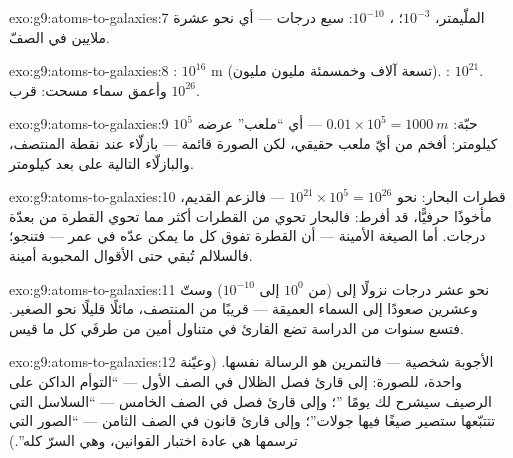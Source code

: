 \begin{solution}{exo:g9:atoms-to-galaxies:7}
الملّيمتر، $10^{-3}$؛ ، $10^{-10}$: سبع درجات --- أي
نحو عشرة ملايين  في الصفّ.
\end{solution}

\begin{solution}{exo:g9:atoms-to-galaxies:8}
: $10^{16}$ \unit{m} (تسعة آلاف وخمسمئة مليون
مليون). : $10^{21}$. وأعمق سماء مسحت: قرب
$10^{26}$.
\end{solution}

\begin{solution}{exo:g9:atoms-to-galaxies:9}
$10^{5}$ حبّة: $0.01 \times 10^{5} = \qty{1000}{m}$ --- أي
``ملعب'' عرضه كيلومتر: أفخم من أيّ ملعب حقيقي، لكن الصورة
قائمة --- بازلّاء عند نقطة المنتصف، والبازلّاء التالية على
بعد كيلومتر.
\end{solution}

\begin{solution}{exo:g9:atoms-to-galaxies:10}
قطرات البحار: نحو $10^{21} \times 10^{5} = 10^{26}$ --- فالزعم
القديم، مأخوذًا حرفيًّا، قد أفرط: فالبحار تحوي من القطرات أكثر
مما تحوي القطرة من  بعدّة درجات. أما الصيغة الأمينة
--- أن  القطرة تفوق كل ما يمكن عدّه في عمر --- فتنجو؛
فالسلالم تُبقي حتى الأقوال المحبوبة أمينة.
\end{solution}

\begin{solution}{exo:g9:atoms-to-galaxies:11}
نحو عشر درجات نزولًا إلى  (من $10^{0}$ إلى $10^{-10}$)
وستّ وعشرين صعودًا إلى السماء العميقة --- قريبًا من المنتصف،
مائلًا قليلًا نحو الصغير. فتسع سنوات من الدراسة تضع القارئ في
متناول أمين من طرفَي كل ما قيس.
\end{solution}

\begin{solution}{exo:g9:atoms-to-galaxies:12}
الأجوبة شخصية --- فالتمرين هو الرسالة نفسها. (وعيّنة واحدة،
للصورة: إلى قارئ فصل الظلال في الصف الأول --- ``التوأم الداكن
على الرصيف سيشرح لك يومًا ''؛ وإلى قارئ فصل 
في الصف الخامس --- ``السلاسل التي تتتبّعها ستصير صيغًا فيها
جولات''؛ وإلى قارئ قانون  في الصف الثامن --- ``الصور التي
ترسمها هي عادة اختبار القوانين، وهي السرّ كله''.)
\end{solution}

